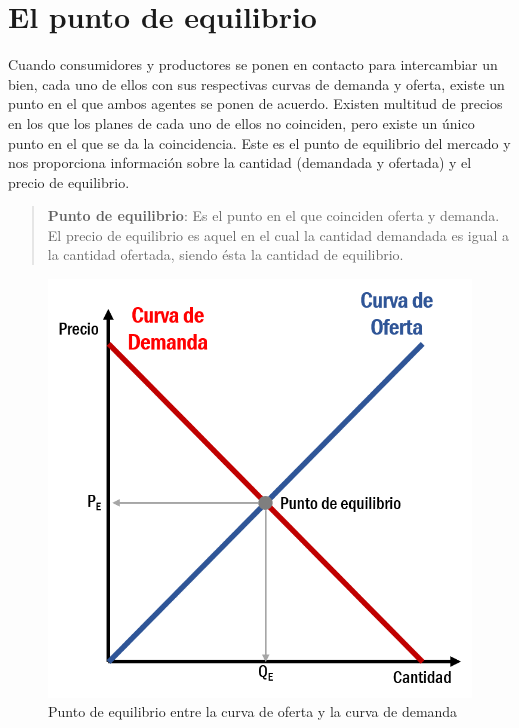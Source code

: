 \documentclass[
]{krantz}
\begin{document}
\hypertarget{el-punto-de-equilibrio}{%
\section{El punto de equilibrio}\label{el-punto-de-equilibrio}}

Cuando consumidores y productores se ponen en contacto para intercambiar un bien, cada uno de ellos con sus respectivas curvas de demanda y oferta, existe un punto en el que ambos agentes se ponen de acuerdo. Existen multitud de precios en los que los planes de cada uno de ellos no coinciden, pero existe un único punto en el que se da la coincidencia. Este es el punto de equilibrio del mercado y nos proporciona información sobre la cantidad (demandada y ofertada) y el precio de equilibrio.

\begin{quote}
\textbf{Punto de equilibrio}:
Es el punto en el que coinciden oferta y demanda. El precio de equilibrio es aquel en el cual la cantidad demandada es igual a la cantidad ofertada, siendo ésta la cantidad de equilibrio.
\end{quote}

\begin{figure}
\centering
\includegraphics{images/12a-05.png}
\caption{\label{fig:12a-05}Punto de equilibrio entre la curva de oferta y la curva de demanda}
\end{figure}
\end{document}
